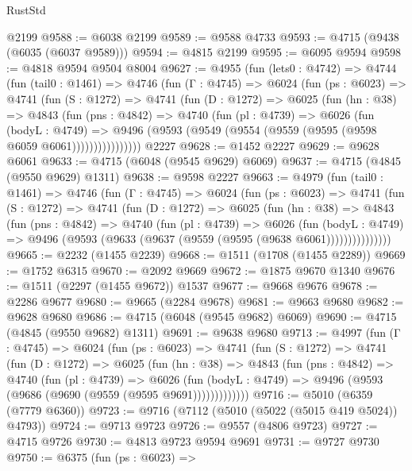 \begin{lexlean}{RustStd}
\begin{coremodule}
    @2199
@9588 := @6038 @2199
@9589 := @9588 @4733
@9593 := @4715 (@9438 (@6035 (@6037 @9589)))
@9594 := @4815 @2199
@9595 := @6095 @9594
@9598 := @4818 @9594 @9504 @8004
@9627 := @4955
    (fun (lets0 : @4742) =>
    @4744
      (fun (tail0 : @1461) =>
      @4746
        (fun (Γ : @4745) =>
        @6024
          (fun (ps : @6023) =>
          @4741
            (fun (S : @1272) =>
            @4741
              (fun (D : @1272) =>
              @6025
                (fun (hn : @38) =>
                @4843
                  (fun (pns : @4842) =>
                  @4740
                    (fun (pl : @4739) =>
                    @6026
                      (fun (bodyL : @4749) =>
                      @9496 (@9593 (@9549 (@9554 (@9559 (@9595 (@9598 @6059 @6061))))))))))))))))
    @2227
@9628 := @1452 @2227
@9629 := @9628 @6061
@9633 := @4715 (@6048 (@9545 @9629) @6069)
@9637 := @4715 (@4845 (@9550 @9629) @1311)
@9638 := @9598 @2227
@9663 := @4979
    (fun (tail0 : @1461) =>
    @4746
      (fun (Γ : @4745) =>
      @6024
        (fun (ps : @6023) =>
        @4741
          (fun (S : @1272) =>
          @4741
            (fun (D : @1272) =>
            @6025
              (fun (hn : @38) =>
              @4843
                (fun (pns : @4842) =>
                @4740
                  (fun (pl : @4739) =>
                  @6026
                    (fun (bodyL : @4749) =>
                    @9496 (@9593 (@9633 (@9637 (@9559 (@9595 (@9638 @6061)))))))))))))))
@9665 := @2232 (@1455 @2239)
@9668 := @1511 (@1708 (@1455 @2289))
@9669 := @1752 @6315
@9670 := @2092 @9669
@9672 := @1875 @9670 @1340
@9676 := @1511 (@2297 (@1455 @9672)) @1537
@9677 := @9668 @9676
@9678 := @2286 @9677
@9680 := @9665 (@2284 @9678)
@9681 := @9663 @9680
@9682 := @9628 @9680
@9686 := @4715 (@6048 (@9545 @9682) @6069)
@9690 := @4715 (@4845 (@9550 @9682) @1311)
@9691 := @9638 @9680
@9713 := @4997
    (fun (Γ : @4745) =>
    @6024
      (fun (ps : @6023) =>
      @4741
        (fun (S : @1272) =>
        @4741
          (fun (D : @1272) =>
          @6025
            (fun (hn : @38) =>
            @4843
              (fun (pns : @4842) =>
              @4740
                (fun (pl : @4739) =>
                @6026
                  (fun (bodyL : @4749) =>
                  @9496 (@9593 (@9686 (@9690 (@9559 (@9595 @9691)))))))))))))
@9716 := @5010 (@6359 (@7779 @6360))
@9723 := @9716 (@7112 (@5010 (@5022 (@5015 @419 @5024)) @4793))
@9724 := @9713 @9723
@9726 := @9557 (@4806 @9723)
@9727 := @4715 @9726
@9730 := @4813 @9723 @9594 @9691
@9731 := @9727 @9730
@9750 := @6375
    (fun (ps : @6023) =>

\end{coremodule}
\end{lexlean}
